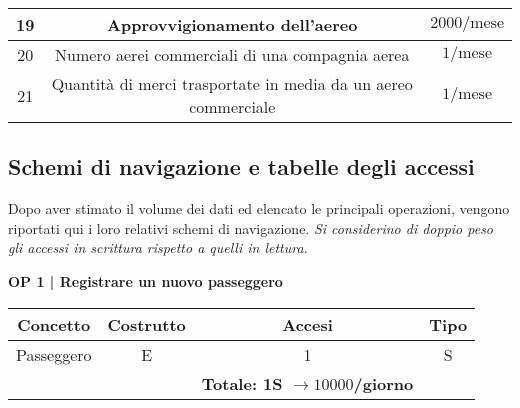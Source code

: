 \begin{tabular}{ | c c c |}
	\hline
	\textsf{\small 19} & \textsf{\small Approvvigionamento dell'aereo} & \textsf{\small $ 2000 / \text{mese} $} \\
	\hline
	\textsf{\small 20} & \textsf{\small Numero aerei commerciali di una compagnia aerea} & \textsf{\small $ 1/ \text{mese} $} \\
	\hline
	\textsf{\small 21} & \textsf{\small Quantità di merci trasportate in media da un aereo commerciale} & \textsf{\small $ 1/ \text{mese} $} \\
	\hline
\end{tabular}



\newpage

\subsection{Schemi di navigazione e tabelle degli accessi}

\textsf{\small Dopo aver stimato il volume dei dati ed elencato le principali operazioni, vengono riportati qui i loro relativi schemi di navigazione. \emph{Si considerino di doppio peso gli accessi in scrittura rispetto a quelli in lettura}.}\break




\textbf{\small OP 1 | Registrare un nuovo passeggero}\\

\begin{tabular}{ c c c c}
	\hline
	\textbf{Concetto} & \textbf{Costrutto} & \textbf{Accesi} & \textbf{Tipo}\\
	\hline
	\textsf{\small Passeggero} & \textsf{\small E} & \textsf{\small 1} &  \textsf{\small S}\\
	\hline
	\textsf{\small } & \textsf{\small } & \textbf{Totale: 1S $\rightarrow 10000$/giorno} \textsf{\small } & \textsf{\small }\\ %
	\hline
\end{tabular}


